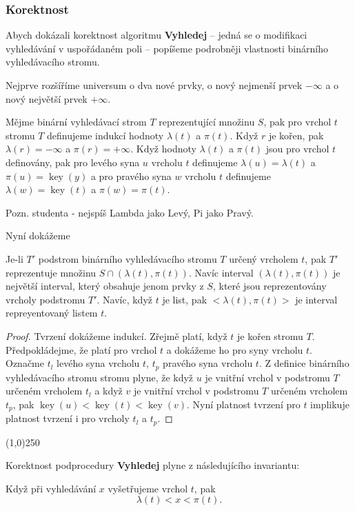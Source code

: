 \documentclass[a4paper,12pt]{article}
\newenvironment{myproof}{
  \begin{proof}
    
  }{
  \end{proof}
  \begin{center}
   \line(1,0){250}
   \end{center}
  }
\DeclareMathOperator*{\key}{key}
\begin{document}
\subsubsection{Korektnost}

Abych dokázali korektnost algoritmu {\bf Vyhledej} -- 
jedná se o modifikaci vyhledávání v uspořádaném poli --
popíšeme po\-drobněji vlastnosti binárního vyhledávacího 
stromu. 

Nej\-prve rozšíříme universum o dva nové prvky, o nový 
nejmenší prvek $-\infty$ a o nový největší prvek $+\infty$. 


Mějme binární vyhledávací strom $T$ reprezentující 
množinu $S$, pak pro vrchol $t$ stromu $T$ definujeme indukcí hodnoty $\lambda(t)$ 
a $\pi(t)$. Když $r$ je kořen, pak $\lambda(r)=-\infty$ a $\pi(r)=+\infty$. 
Když hodnoty $\lambda(t)$ a $\pi(t)$ jsou pro vrchol $t$ definovány, pak pro levého syna $u$ vrcholu $t$ definujeme $\lambda(u)=\lambda(t)$ a $\pi(u)=\key(y)$
a pro pravého syna $w$ vrcholu $t$ definujeme $\lambda(w)=\key(t)$ a $\pi(w)=\pi(t)$.

Pozn. studenta - nejspíš Lambda jako Levý, Pi jako Pravý.

Nyní dokážeme

\begin{lemma}Je-li $T'$ podstrom binárního vyhledávacího 
stromu $T$ určený vrcholem $t$, pak $T'$ reprezentuje množinu 
$S\cap (\lambda (t),\pi (t))$. Navíc interval $(\lambda (t),\pi 
(t))$ je největší interval, 
který obsahuje jenom prvky z $S$, které jsou reprezentovány 
vrcholy podstromu $T'$. Navíc, když $t$ je list, pak $<\lambda(t),\pi(t)>$ je interval repreyentovaný listem $t$.
\end{lemma}

\begin{myproof}Tvrzení dokážeme indukcí.  Zřejmě platí, 
když $t$ je kořen stromu $T$.  Předpokládej\-me, že platí pro vrchol 
$t$ a doká\-že\-me ho pro syny vrcholu $t$.  Označme $t_l$ levého syna 
vrcholu $t$, $t_p$ pravého syna vrcholu $t$.  Z definice binárního 
vyhledávacího stromu stromu plyne, že když $u$ je vnitřní 
vrchol v podstromu $T$ určeném vrcholem $t_l$ a když $v$ je vnitřní 
vrchol v podstromu $T$ určeném vrcholem $t_p$, pak 
$\key(u)<\key(t)<\key(v)$.  Nyní platnost tvrzení pro $t$ 
implikuje platnost tvrzení i pro vrcholy $t_l$ a $t_p$. 
\end{myproof}

Korektnost podprocedury {\bf Vyhledej} plyne z 
následujícího invariantu:
\begin{lemma}
Když při vyhledávání $x$ vyšetřujeme vrchol $
t$, pak 
$$\lambda (t)<x<\pi (t).$$
\end{lemma}
\end{document}
